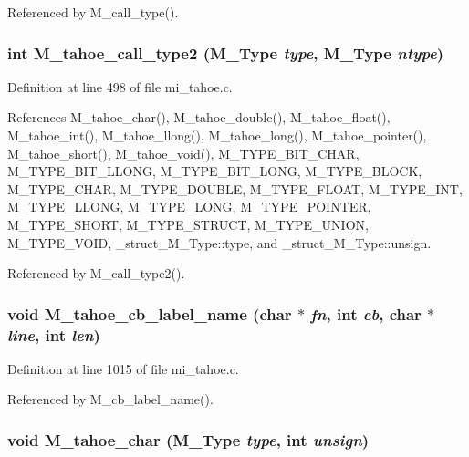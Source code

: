 Referenced by M\_\-call\_\-type().
\subsubsection{\setlength{\rightskip}{0pt plus 5cm}int M\_\-tahoe\_\-call\_\-type2 (\bf{M\_\-Type} {\em type}, \bf{M\_\-Type} {\em ntype})}\label{mi__tahoe_8c_6ec662cacd0816f49a4e3895db514ae3}




Definition at line 498 of file mi\_\-tahoe.c.

References M\_\-tahoe\_\-char(), M\_\-tahoe\_\-double(), M\_\-tahoe\_\-float(), M\_\-tahoe\_\-int(), M\_\-tahoe\_\-llong(), M\_\-tahoe\_\-long(), M\_\-tahoe\_\-pointer(), M\_\-tahoe\_\-short(), M\_\-tahoe\_\-void(), M\_\-TYPE\_\-BIT\_\-CHAR, M\_\-TYPE\_\-BIT\_\-LLONG, M\_\-TYPE\_\-BIT\_\-LONG, M\_\-TYPE\_\-BLOCK, M\_\-TYPE\_\-CHAR, M\_\-TYPE\_\-DOUBLE, M\_\-TYPE\_\-FLOAT, M\_\-TYPE\_\-INT, M\_\-TYPE\_\-LLONG, M\_\-TYPE\_\-LONG, M\_\-TYPE\_\-POINTER, M\_\-TYPE\_\-SHORT, M\_\-TYPE\_\-STRUCT, M\_\-TYPE\_\-UNION, M\_\-TYPE\_\-VOID, \_\-struct\_\-M\_\-Type::type, and \_\-struct\_\-M\_\-Type::unsign.

Referenced by M\_\-call\_\-type2().
\subsubsection{\setlength{\rightskip}{0pt plus 5cm}void M\_\-tahoe\_\-cb\_\-label\_\-name (char $\ast$ {\em fn}, int {\em cb}, char $\ast$ {\em line}, int {\em len})}\label{mi__tahoe_8c_560c43663569b5e87f35ac39699c53c7}




Definition at line 1015 of file mi\_\-tahoe.c.

Referenced by M\_\-cb\_\-label\_\-name().
\subsubsection{\setlength{\rightskip}{0pt plus 5cm}void M\_\-tahoe\_\-char (\bf{M\_\-Type} {\em type}, int {\em unsign})}\label{mi__tahoe_8c_5697c3ce4a7a5a7560d40675f73427c2}




